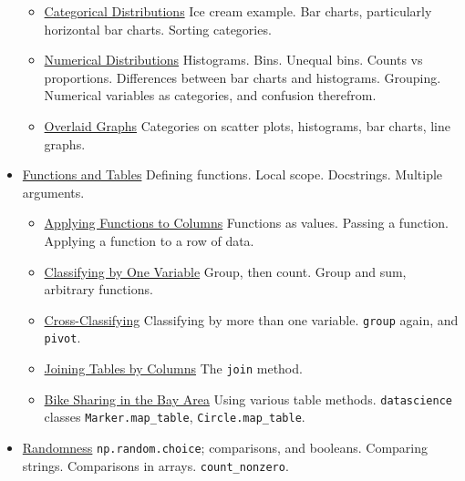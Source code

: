\begin{itemize}
  \begin{itemize}
  \tightlist
  \item
    \href{chapters/06/1/visualizing-categorical-distributions.md}{Categorical
    Distributions} Ice cream example. Bar charts, particularly
    horizontal bar charts. Sorting categories.
  \item
    \href{chapters/06/2/visualizing-numerical-distributions.md}{Numerical
    Distributions} Histograms. Bins. Unequal bins. Counts vs
    proportions. Differences between bar charts and histograms.
    Grouping. Numerical variables as categories, and confusion
    therefrom.
  \item
    \href{chapters/06/3/overlaid-graphs.md}{Overlaid Graphs} Categories
    on scatter plots, histograms, bar charts, line graphs.
  \end{itemize}
\item
  \href{chapters/07/functions-and-tables.md}{Functions and Tables}
  Defining functions. Local scope. Docstrings. Multiple arguments.

  \begin{itemize}
  \tightlist
  \item
    \href{chapters/07/1/applying-a-function-to-a-column.md}{Applying
    Functions to Columns} Functions as values. Passing a function.
    Applying a function to a row of data.
  \item
    \href{chapters/07/2/classifying-by-one-variable.md}{Classifying by
    One Variable} Group, then count. Group and sum, arbitrary functions.
  \item
    \href{chapters/07/3/cross-classifying-by-more-than-one-variable.md}{Cross-Classifying}
    Classifying by more than one variable. \texttt{group} again, and
    \texttt{pivot}.
  \item
    \href{chapters/07/4/joining-tables-by-columns.md}{Joining Tables by
    Columns} The \texttt{join} method.
  \item
    \href{chapters/07/5/bike-sharing-in-the-bay-area.md}{Bike Sharing in
    the Bay Area} Using various table methods. \texttt{datascience}
    classes \texttt{Marker.map\_table}, \texttt{Circle.map\_table}.
  \end{itemize}
\item
  \href{chapters/08/randomness.md}{Randomness}
  \texttt{np.random.choice}; comparisons, and booleans. Comparing
  strings. Comparisons in arrays. \texttt{count\_nonzero}.


\end{itemize}
